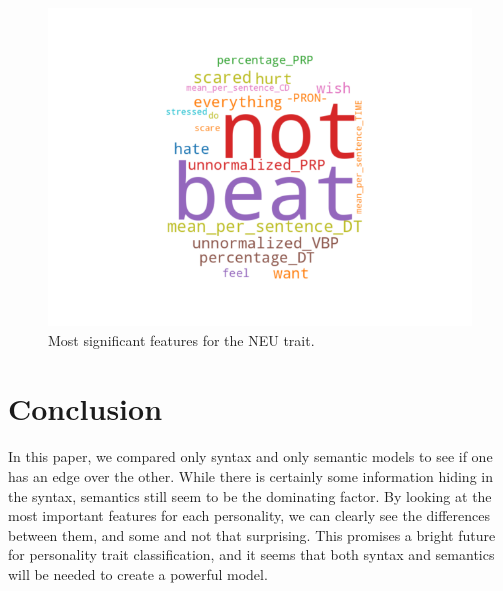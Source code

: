 \documentclass[10pt, a4paper]{article}
\begin{document}
\begin{figure}
\begin{center}
  \includegraphics[width=\columnwidth]{figures/cNEU.png}
  \caption{Most significant features for the NEU trait.}
  \label{fig:figure5}
\end{center}
\end{figure}

\section{Conclusion}
In this paper, we compared only syntax and only semantic models to see if one has an edge over the other.
While there is certainly some information hiding in the syntax, semantics still seem to be the dominating factor.
By looking at the most important features for each personality, we can clearly see the differences between them, and some and not that surprising.
This promises a bright future for personality trait classification, and it seems that both syntax and semantics will be needed to create a powerful model.



\end{document}
